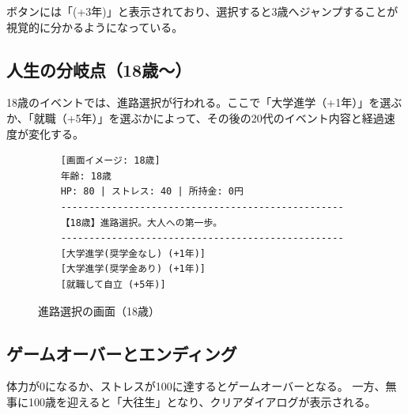 \documentclass[a4paper,11pt]{jsarticle}
\begin{document}
ボタンには「(+3年)」と表示されており、選択すると3歳へジャンプすることが視覚的に分かるようになっている。

\subsection{人生の分岐点（18歳〜）}
18歳のイベントでは、進路選択が行われる。ここで「大学進学（+1年）」を選ぶか、「就職（+5年）」を選ぶかによって、その後の20代のイベント内容と経過速度が変化する。

\begin{figure}[H]
    \centering
    \begin{verbatim}
    [画面イメージ: 18歳]
    年齢: 18歳
    HP: 80 | ストレス: 40 | 所持金: 0円
    --------------------------------------------------
    【18歳】進路選択。大人への第一歩。
    --------------------------------------------------
    [大学進学(奨学金なし) (+1年)]
    [大学進学(奨学金あり) (+1年)]
    [就職して自立 (+5年)]
    \end{verbatim}
    \caption{進路選択の画面（18歳）}
\end{figure}

\subsection{ゲームオーバーとエンディング}
体力が0になるか、ストレスが100に達するとゲームオーバーとなる。
一方、無事に100歳を迎えると「大往生」となり、クリアダイアログが表示される。
\end{document}
